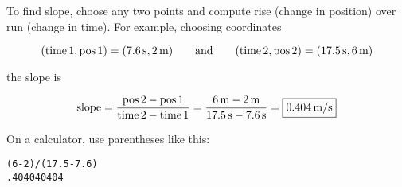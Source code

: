 \documentclass[../main-physics-problems.tex]{subfiles}
\begin{document}
\begin{questions}
\begin{parts}
\begin{solution}
    To find slope, choose any two points and compute rise (change in position) over run (change in time). For example, choosing coordinates

    \begin{equation*}
        (\text{time\,1},\text{pos\,1}) = (\SI{7.6}{s},\SI{2}{m}) \qquad \text{and} \qquad
        (\text{time\,2},\text{pos\,2}) = (\SI{17.5}{s},\SI{6}{m})
    \end{equation*}
    
    the slope is

    \begin{equation*}
        \text{slope} = \frac{\text{pos\,2} - \text{pos\,1}}{\text{time\,2} - \text{time\,1}} 
        = \frac{\SI{6}{m} - \SI{2}{m}}{\SI{17.5}{s} - \SI{7.6}{s}} = \boxed{\SI{0.404}{m/s}}
    \end{equation*}

    \bigskip

    On a calculator, use parentheses like this:

    \medskip

    \begin{center}
        \texttt{(6-2)/(17.5-7.6)}\\
        \hspace{2.5em} \texttt{.404040404}
    \end{center}
\end{solution}

\end{parts}



\end{questions}
\end{document}
